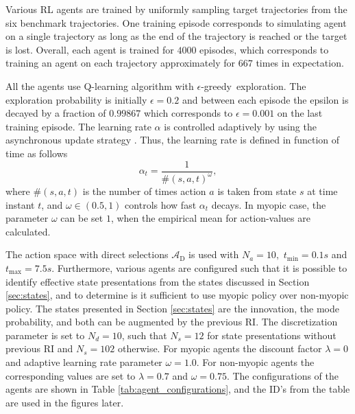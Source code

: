 \documentclass[english, 12pt, a4paper, elec, utf8, a-1b, online]{aaltothesis}
\newcommand{\As}{\mathcal{A}}
\newcommand{\egreedy}{$\epsilon$-greedy~}
\newcommand{\tmax}{t_\text{max}}
\newcommand{\tmin}{t_\text{min}}
\newcommand{\Asdir}{\As_\text{D}}
\begin{document}
Various RL agents are trained by uniformly sampling target trajectories from the six benchmark trajectories.
One training episode corresponds to simulating agent on a single trajectory as long as the end of the trajectory is reached or the target is lost.
Overall, each agent is trained for $4000$ episodes, which corresponds to training an agent on each trajectory approximately for $667$ times in expectation.

All the agents use Q-learning algorithm with \egreedy exploration.
The exploration probability is initially $\epsilon=0.2$ and between each episode the epsilon is decayed by a fraction of $0.99867$ which corresponds to $\epsilon=0.001$ on the last training episode.
The learning rate $\alpha$ is controlled adaptively by using the asynchronous update strategy \cite{Even-Dar2003}.
Thus, the learning rate is defined in function of time as follows
\begin{equation}
    \alpha_t = \frac{1}{\#(s, a, t)^\omega},
\end{equation}
where $\#(s, a, t)$ is the number of times action $a$ is taken from state $s$ at time instant $t$, and $\omega \in (0.5, 1)$ controls how fast $\alpha_t$ decays.
In myopic case, the parameter $\omega$ can be set $1$, when the empirical mean for action-values are calculated.

The action space with direct selections $\Asdir$ is used with $N_a=10,$ $\tmin=0.1s$ and $\tmax=7.5s$.
Furthermore, various agents are configured such that it is possible to identify effective state presentations from the states discussed in Section \ref{sec:states}, and to determine is it sufficient to use myopic policy over non-myopic policy.
The states presented in Section \ref{sec:states} are the innovation, the mode probability, and both can be augmented by the previous RI.
The discretization parameter is set to $N_d=10$, such that $N_s=12$ for state presentations without previous RI and $N_s=102$ otherwise.
For myopic agents the discount factor $\lambda=0$ and adaptive learning rate parameter $\omega=1.0$.
For non-myopic agents the corresponding values are set to $\lambda=0.7$ and $\omega=0.75$. 
The configurations of the agents are shown in Table \ref{tab:agent_configurations}, and the ID's from the table are used in the figures later.
\end{document}
